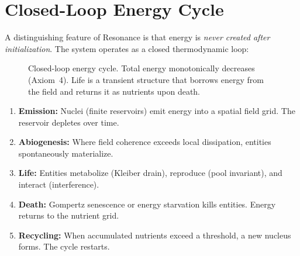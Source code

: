 \documentclass[11pt,a4paper]{article}
\begin{document}
\section{Closed-Loop Energy Cycle}
\label{sec:energy-cycle}

A distinguishing feature of Resonance is that energy is
\emph{never created after initialization}. The system operates
as a closed thermodynamic loop:

\begin{figure}[h]
\centering
{}
\caption{Closed-loop energy cycle. Total energy monotonically
decreases (Axiom~4). Life is a transient structure that borrows
energy from the field and returns it as nutrients upon death.}
\label{fig:energy-cycle}
\end{figure}

\begin{enumerate}
  \item \textbf{Emission:} Nuclei (finite reservoirs) emit energy
        into a spatial field grid. The reservoir depletes over time.
  \item \textbf{Abiogenesis:} Where field coherence exceeds local
        dissipation, entities spontaneously materialize.
  \item \textbf{Life:} Entities metabolize (Kleiber drain),
        reproduce (pool invariant), and interact (interference).
  \item \textbf{Death:} Gompertz senescence or energy starvation
        kills entities. Energy returns to the nutrient grid.
  \item \textbf{Recycling:} When accumulated nutrients exceed
        a threshold, a new nucleus forms. The cycle restarts.
\end{enumerate}
\end{document}
